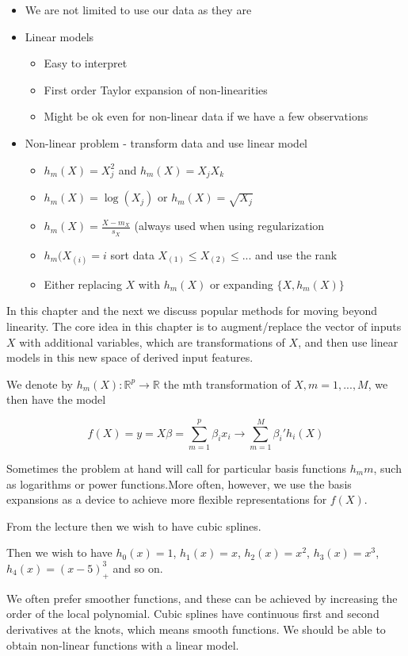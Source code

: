 \begin{itemize}
  \item We are not limited to use our data as they are
  \item Linear models
  \begin{itemize}
    \item Easy to interpret
    \item First order Taylor expansion of non-linearities
    \item Might be ok even for non-linear data if we have a few observations
  \end{itemize}
  \item Non-linear problem - transform data and use linear model
  \begin{itemize}
    \item $h_m  (X) = X^2_j$ and $h_m (X) = X_j X_k$
    \item $h_m (X) = \log (X_j )$ or $h_m (X) = \sqrt{X_j}$
    \item $h_m (X) = \frac{X - m_X}{s_X}$ (always used when using regularization
    \item $h_m(X_{(i)} = i$ sort data $X_{(1)} \leq X_{(2) } \leq ...$ and use the rank
    \item Either replacing $X$ with $h_m(X)$ or expanding $\{X, h_m(X)\}$
  \end{itemize}
\end{itemize}

In this chapter and the next we discuss popular methods for moving
beyond linearity. The core idea in this chapter is to augment/replace the vector of inputs $X$ with additional variables, which are transformations of $X$, and then use linear models in this new space of derived input features.

We denote by $h_m (X)  : \mathbb{R}^p \rightarrow \mathbb{R}$ the mth transformation of $X, m = 1, ..., M$, we then have the model

\[
    f(X) = y = X \beta = \sum_{m = 1}^{p} \beta_i x_i \rightarrow \sum_{m = 1}^{M} \beta_i ' h_i (X)
\]

Sometimes the problem at hand will call for particular basis functions $h_mm$, such as logarithms or power functions.More often, however, we use the basis expansions as a device to achieve more flexible representations for $f(X)$.

From the lecture \cite[p.~47]{lecture4} then we wish to have cubic splines.

Then we wish to have $h_0 (x) = 1$, $h_1 (x) = x$, $h_2 (x) = x^2$, $h_3 (x) = x^3$, $h_4(x) = (x-5)^3_+$ and so on.

We often prefer smoother functions, and these can be achieved by increasing the order of the local polynomial. Cubic splines have continuous first and second derivatives at the knots, which means smooth functions. We should be able to obtain non-linear functions with a linear model. 